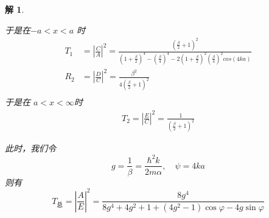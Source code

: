 \documentclass{article}
\newtheorem{solution}{解}
\begin{document}
\begin{solution}
\begin{enumerate}
\begin{enumerate}
                于是在$-a<x<a$ 时
                \begin{align*}
                    T_{1}&=\left|\frac{C}{A}\right|^2=\frac{\left(\frac{\beta}{2}+1\right)^2}{\left(1+\frac{\beta}{2}\right)^4-\left(\frac{\beta}{4}\right)^4-2\left(1+\frac{\beta}{2}\right)^2\left(\frac{\beta}{4}\right)^2cos(4ka)} \\
                    R_{2}&=\left|\frac{D}{C}\right|^{2}=\frac{\beta^{2}}{4\left(\frac{\beta}{2}+1\right)^{2}} \\
                \end{align*}
                于是在 $a<x<\infty$时
                \begin{align*}
                    T_{2}=\left|\frac{E}{C}\right|^{2}=\frac{1}{\left(\frac{\beta}{2}+1\right)^{2}}
                \end{align*}
                
                此时，我们令
                \[g=\frac{1}{\beta}=\frac{\hbar^{2}k}{2m\alpha},\quad\psi=4ka \]
                则有
                \[ T_{\mathrm{总}}=\left|\frac{A}{E}\right|^{2}=\frac{8g^{4}}{8g^{4}+4g^{2}+1+(4g^{2}-1)\cos\varphi-4g\sin\varphi} \]
            

\end{enumerate}
\end{enumerate}
\end{solution}
\end{document}
